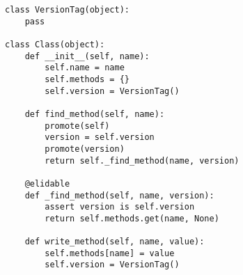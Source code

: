 {\noop
\begin{lstlisting}[mathescape,basicstyle=\ttfamily]
class VersionTag(object):
    pass

class Class(object):
    def __init__(self, name):
        self.name = name
        self.methods = {}
        self.version = VersionTag()

    def find_method(self, name):
        promote(self)
        version = self.version
        promote(version)
        return self._find_method(name, version)

    @elidable
    def _find_method(self, name, version):
        assert version is self.version
        return self.methods.get(name, None)

    def write_method(self, name, value):
        self.methods[name] = value
        self.version = VersionTag()
\end{lstlisting}
}
